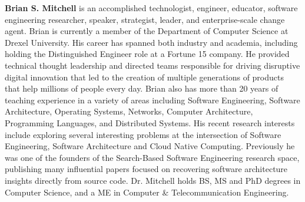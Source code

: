 \documentclass[conference]{IEEEtran}
\begin{document}
\noindent\textbf{Brian S. Mitchell} is an accomplished technologist, engineer, educator, software engineering researcher, speaker, strategist, leader, and enterprise-scale change agent. Brian is currently a member of the Department of Computer Science at Drexel University. His career has spanned both industry and academia, including holding the Distinguished Engineer role at a Fortune 15 company. He provided technical thought leadership and directed teams responsible for driving disruptive digital innovation that led to the creation of multiple generations of products that help millions of people every day. Brian also has more than 20 years of teaching experience in a variety of areas including Software Engineering, Software Architecture, Operating Systems, Networks, Computer Architecture, Programming Languages, and Distributed Systems. His recent research interests include exploring several interesting problems at the intersection of Software Engineering, Software Architecture and Cloud Native Computing. Previously he was one of the founders of the Search-Based Software Engineering research space, publishing many influential papers focused on recovering software architecture insights directly from source code. Dr. Mitchell holds BS, MS and PhD degrees in Computer Science, and a ME in Computer \& Telecommunication Engineering.

\fi
\end{document}
